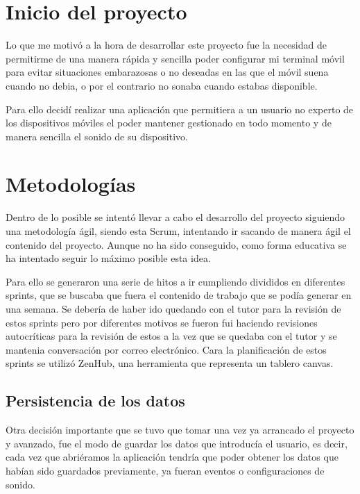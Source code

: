 
\section{Inicio del proyecto}

Lo que me motivó a la hora de desarrollar este proyecto fue la necesidad de permitirme de una manera rápida y sencilla poder configurar mi terminal móvil para evitar situaciones embarazosas o no deseadas en las que el móvil suena cuando no debia, o por el contrario no sonaba cuando estabas disponible.

Para ello decidí realizar una aplicación que permitiera a un usuario no experto de los dispositivos móviles el poder mantener gestionado en todo momento y de manera sencilla el sonido de su dispositivo.

\section{Metodologías}

Dentro de lo posible se intentó llevar a cabo el desarrollo del proyecto siguiendo una metodología ágil, siendo esta Scrum, intentando ir sacando de manera ágil el contenido del proyecto.
Aunque no ha sido conseguido, como forma educativa se ha intentado seguir lo máximo posible esta idea.

Para ello se generaron una serie de hitos a ir cumpliendo divididos en diferentes sprints, que se buscaba que fuera el contenido de trabajo que se podía generar en una semana. Se debería de haber ido quedando con el tutor para la revisión de estos sprints pero por diferentes motivos se fueron fui haciendo revisiones autocríticas para la revisión de estos a la vez que se quedaba con el tutor y se mantenia conversación por correo electrónico.
Cara la planificación de estos sprints se utilizó ZenHub, una herramienta que representa un tablero canvas.

\subsection{Persistencia de los datos}
Otra decisión importante que se tuvo que tomar una vez ya arrancado el proyecto y avanzado, fue el modo de guardar los datos que introducía el usuario, es decir, cada vez que abriéramos la aplicación tendría que poder obtener los datos que habían sido guardados previamente, ya fueran eventos o configuraciones de sonido.

